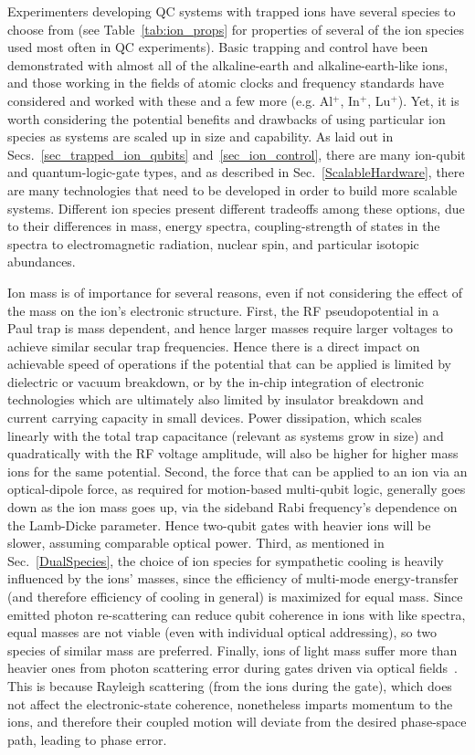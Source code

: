 \documentclass[%
12pt,
 amsmath,amssymb,
]{revtex4-2}
\begin{document}
Experimenters developing QC systems with trapped ions have several species to choose from (see Table~\ref{tab:ion_props} for properties of several of the ion species used most often in QC experiments).  Basic trapping and control have been demonstrated with almost all of the alkaline-earth and alkaline-earth-like ions, and those working in the fields of atomic clocks and frequency standards have considered and worked with these and a few more (e.g. Al$^{+}$, In$^{+}$, Lu$^{+}$). Yet, it is worth considering the potential benefits and drawbacks of using particular ion species as systems are scaled up in size and capability.  As laid out in Secs.~\ref{sec_trapped_ion_qubits} and~\ref{sec_ion_control}, there are many ion-qubit and quantum-logic-gate types, and as described in Sec.~\ref{ScalableHardware}, there are many technologies that need to be developed in order to build more scalable systems.  Different ion species present different tradeoffs among these options, due to their differences in mass, energy spectra, coupling-strength of states in the spectra to electromagnetic radiation, nuclear spin, and particular isotopic abundances.

Ion mass is of importance for several reasons, even if not considering the effect of the mass on the ion's electronic structure.  First, the RF pseudopotential in a Paul trap is mass dependent, and hence larger masses require larger voltages to achieve similar secular trap frequencies.  Hence there is a direct impact on achievable speed of operations if the potential that can be applied is limited by dielectric or vacuum breakdown, or by the in-chip integration of electronic technologies which are ultimately also limited by insulator breakdown and current carrying capacity in small devices.  Power dissipation, which scales linearly with the total trap capacitance (relevant as systems grow in size) and quadratically with the RF voltage amplitude, will also be higher for higher mass ions for the same potential.  Second, the force that can be applied to an ion via an optical-dipole force, as required for motion-based multi-qubit logic, generally goes down as the ion mass goes up, via the sideband Rabi frequency's dependence on the Lamb-Dicke parameter.  Hence two-qubit gates with heavier ions will be slower, assuming comparable optical power.  Third, as mentioned in Sec.~\ref{DualSpecies}, the choice of ion species for sympathetic cooling is heavily influenced by the ions' masses, since the efficiency of multi-mode energy-transfer (and therefore efficiency of cooling in general) is maximized for equal mass.  Since emitted photon re-scattering can reduce qubit coherence in ions with like spectra, equal masses are not viable (even with individual optical addressing), so two species of similar mass are preferred.  Finally, ions of light mass suffer more than heavier ones from photon scattering error during gates driven via optical fields~\cite{PhysRevA.75.042329_2007}.  This is because Rayleigh scattering (from the ions during the gate), which does not affect the electronic-state coherence, nonetheless imparts momentum to the ions, and therefore their coupled motion will deviate from the desired phase-space path, leading to phase error.
\end{document}
